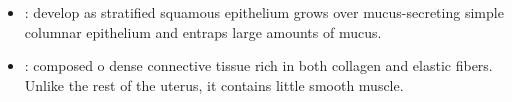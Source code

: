 \begin{multicols}{2}
\begin{itemize}
  \begin{center}
  \end{center}
  
  \item {}: develop as stratified squamous epithelium grows over mucus-secreting simple columnar epithelium and entraps large amounts of mucus.
  
  \begin{center}
  \end{center}
  
  \item {}: composed o dense connective tissue rich in both collagen and elastic fibers. Unlike the rest of the uterus, it contains little smooth muscle.
  
  \begin{center}
  \end{center}
  
\end{itemize}
\end{multicols}

